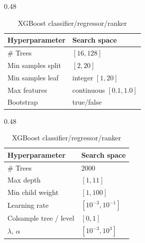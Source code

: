 \begin{table}[!htbp]
  \medskip
  \begin{subtable}[t]{0.48\textwidth}
    \centering
    \caption{RF classifier/regressor}
    \begin{tabular}{ll}
      \toprule
      Hyperparameter & Search space \\
      \midrule
      \# Trees &  $[16,128]$\\
      Min samples split & $[2,20]$ \\
      Min samples leaf & integer $[1,20]$ \\
      Max features & continuous $[0.1,1.0]$ \\
      Bootstrap & true/false \\
      \bottomrule
    \end{tabular}%
  \end{subtable}
  \hfill
  \begin{subtable}[t]{0.48\textwidth}
    \centering
    \caption{XGBoost classifier/regressor/ranker}
    \begin{tabular}{ll}
      \toprule
      Hyperparameter & Search space \\
      \midrule
      \# Trees &  2000  \\
      Max depth & $[1,11]$ \\
      Min child weight & $[1,100]$  \\
      Learning rate & $[10^{-3},10^{-1}]$ \\
      Colsample tree / level & $[0,1]$ \\
      $\lambda$, $\alpha$ & $[10^{-3},10^3]$ \\
      \bottomrule
    \end{tabular}%
  \end{subtable}
\end{table}


